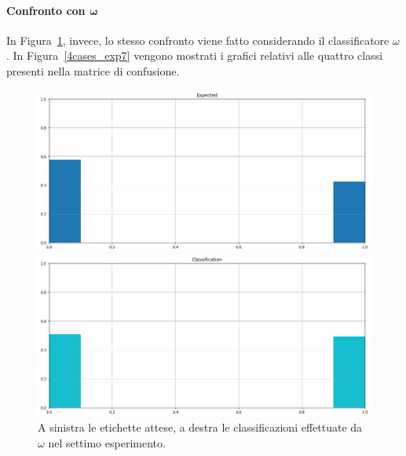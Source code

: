 \documentclass[12pt]{report}
\theoremstyle{definition}
\begin{document}
\paragraph{Confronto con $\bm{\omega}$}
In Figura~\ref{classification_exp7}, invece, lo stesso confronto viene fatto considerando il classificatore $\omega$. 
In Figura~\ref{4cases_exp7} vengono mostrati i grafici relativi alle quattro classi presenti nella matrice di confusione.
\begin{figure}
\centering
    \begin{minipage}{0.48\textwidth}
        \includegraphics[width=\linewidth]{images/experiment kaggle/expected_classification.png}
    \end{minipage}
    \begin{minipage}{0.48\textwidth}
        \includegraphics[width=\linewidth]{images/experiment kaggle/prediction_classification.png}
    \end{minipage}
    \caption{A sinistra le etichette attese, a destra le classificazioni effettuate da $\omega$ nel settimo esperimento.}
    \label{classification_exp7}
\end{figure}
\end{document}
